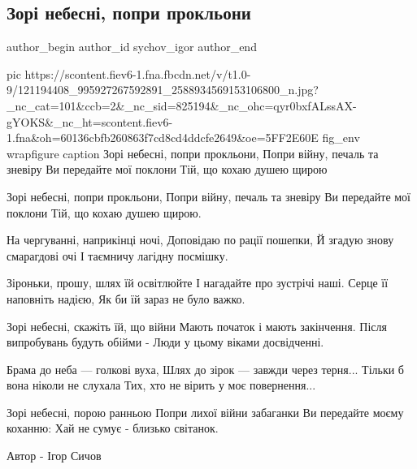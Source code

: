  
 
 
 
 

\subsection{Зорі небесні, попри прокльони}
\label{sec:14_10_2020.fb.sychov_igor.1.zori_nebesni}

\ifcmt
  author_begin
   author_id sychov_igor
  author_end
\fi

\ifcmt
pic https://scontent.fiev6-1.fna.fbcdn.net/v/t1.0-9/121194408_995927267592891_2588934569153106800_n.jpg?_nc_cat=101&ccb=2&_nc_sid=825194&_nc_ohc=qyr0bxfALssAX-gYOKS&_nc_ht=scontent.fiev6-1.fna&oh=60136cbfb260863f7cd8cd4ddcfe2649&oe=5FF2E60E
fig_env wrapfigure
caption Зорі небесні, попри прокльони, Попри війну, печаль та зневіру Ви передайте мої поклони Тій, що кохаю душею щирою
\fi

\obeycr
Зорі небесні, попри прокльони,
Попри війну, печаль та зневіру
Ви передайте мої поклони
Тій, що кохаю душею щирою.

На чергуванні, наприкінці ночі,
Доповідаю по рації пошепки,
Й згадую знову смарагдові очі
І таємничу лагідну посмішку.

Зіроньки, прошу, шлях їй освітлюйте
І нагадайте про зустрічі наші.
Серце її наповніть надією,
Як би їй зараз не було важко.

Зорі небесні, скажіть їй, що війни
Мають початок і мають закінчення.
Після випробувань будуть обійми -
Люди у цьому віками досвідченні.

Брама до неба — голкові вуха,
Шлях до зірок — завжди через терня...
Тільки б вона ніколи не слухала
Тих, хто не вірить у моє повернення...

Зорі небесні, порою ранньою
Попри лихої війни забаганки
Ви передайте моєму коханню:
Хай не сумує - близько світанок.

Автор - Ігор Сичов
\restorecr
